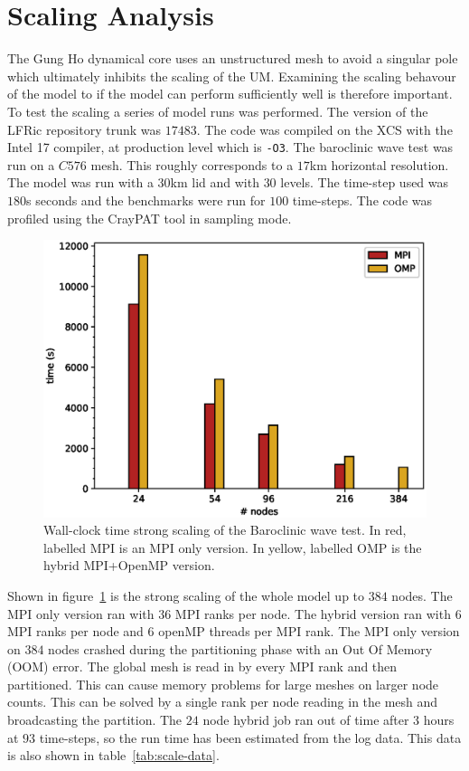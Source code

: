 \section{\label{sec:scale}Scaling Analysis}
The Gung Ho dynamical core uses an unstructured mesh to avoid a
singular pole which ultimately inhibits the scaling of the
UM. Examining the scaling behavour of the model to if the model can
perform sufficiently well is therefore important. To test the scaling a series
of model runs was performed. The version of the LFRic repository trunk
was $17483$. The code was compiled on the XCS with the Intel 17
compiler, at production level which is \verb+-O3+. The baroclinic wave
test was run on a $C576$ mesh. This roughly corresponds to a $17$km
horizontal resolution. The model was run with a $30$km lid and with
$30$ levels.  The time-step used was $180$s
seconds and the benchmarks were run for $100$ time-steps. The code was
profiled using the CrayPAT tool in sampling mode. 

\begin{figure}
\centering\includegraphics[width=1.0\linewidth]{figs/wc-scale.eps}
\caption{\label{fig:wc_scale}Wall-clock time strong scaling of the 
  Baroclinic wave test. In red, labelled MPI is an MPI only
  version. In yellow, labelled OMP is the hybrid MPI+OpenMP version.}
\end{figure} 

Shown in figure~\ref{fig:wc_scale} is the strong scaling of the whole
model up to $384$ nodes. The MPI only version ran with $36$ MPI ranks
per node. The hybrid version ran with $6$ MPI ranks per node and $6$
openMP threads per MPI rank. The MPI only version on $384$ nodes
crashed during the partitioning phase with an Out Of Memory (OOM)
error. The global mesh is read in by every MPI rank and then
partitioned. This can cause memory problems for large meshes on larger
node counts. This can be solved by a single rank per node reading in
the mesh and broadcasting the partition. The $24$ node hybrid job ran
out of time after 3 hours at $93$ time-steps, so the run time has been
estimated from the log data. This data is also shown in
table~\ref{tab:scale-data}.


